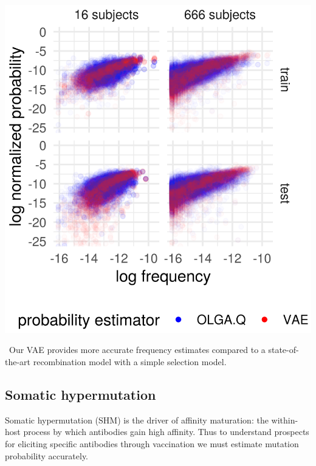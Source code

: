 \documentclass[nobib]{tufte-handout}
\begin{document}
\begin{marginfigure}[0.2in]%
\begin{centering}
    \includegraphics[width=\textwidth]{log_normed_Ppost_vs_log_normed_Pvae.png}
\end{centering}
  \caption{\
    Our VAE provides more accurate frequency estimates compared to a state-of-the-art recombination model with a simple selection model.
    }
  \label{FIGfrequency}
\end{marginfigure}%

\subsection*{Somatic hypermutation}

Somatic hypermutation (SHM) is the driver of affinity maturation: the within-host process by which antibodies gain high affinity.
Thus to understand prospects for eliciting specific antibodies through vaccination we must estimate mutation probability accurately.
\end{document}

